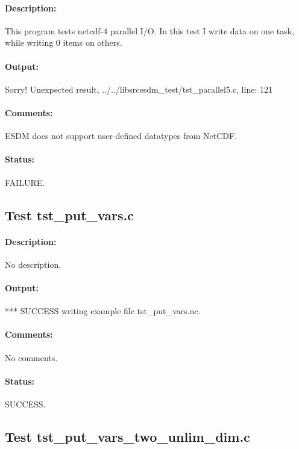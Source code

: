 \paragraph{Description:} This program tests netcdf-4 parallel I/O.
In this test I write data on one task, while writing 0 items on others.

\paragraph{Output:} Sorry! Unexpected result, ../../libsrcesdm\_test/tst\_parallel5.c, line: 121

\paragraph{Comments:} ESDM does not support user-defined datatypes from NetCDF.

\paragraph{Status:} FAILURE.

\subsection{Test tst\_put\_vars.c}

\paragraph{Description:} No description.

\paragraph{Output:} *** SUCCESS writing example file tst\_put\_vars.nc.

\paragraph{Comments:} No comments.

\paragraph{Status:} SUCCESS.

\subsection{Test tst\_put\_vars\_two\_unlim\_dim.c}

